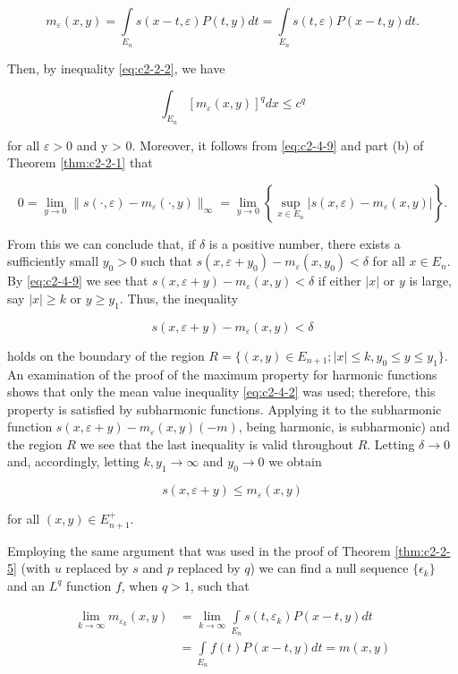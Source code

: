 \[
m_{\varepsilon}(x,y)=\int\limits_{E_{n}}s(x-t,\varepsilon)P(t,y)d t=\int\limits_{E_{n}}s(t,\varepsilon)P(x-t,y)d t.
\]

Then, by inequality \eqref{eq:c2-2-2}, we have

\begin{equation}\label{eq:c2-4-11}
\int_{E_{n}}[m_{\varepsilon}(x,y)]^{q}dx\leq c^{q}
\end{equation}

for all $\varepsilon > 0$ and y > 0. Moreover, it follows from \eqref{eq:c2-4-9} and part (b) of Theorem \ref{thm:c2-2-1} that

\[
0=\lim_{y\to0}\|s(\cdot,\varepsilon)-m_{\varepsilon}(\cdot,y)\|_{\infty}=\lim_{y\to0}\left\{\sup_{x\in E_{n}}|s(x,\varepsilon)-m_{\varepsilon}(x,y)|\right\}.
\]

From this we can conclude that, if $\delta$ is a positive number, there exists a sufficiently small $y_0 > 0$ such that $s(x, \varepsilon + y_0) - m_\varepsilon(x, y_0) < \delta$ for all $x \in E_n$. By \eqref{eq:c2-4-9} we see that $s(x, \varepsilon + y) - m_\varepsilon(x, y) < \delta$ if either $|x|$ or $y$ is large, say $|x| \geq k$ or $y \geq y_1$. Thus, the inequality

\[
s(x,\varepsilon+y)-m_{\varepsilon}(x,y)<\delta
\]

holds on the boundary of the region $R = \{(x, y) \in E_{n+1}; |x| \leq k, y_0 \leq y \leq y_1\}$. An examination of the proof of the maximum property for harmonic functions shows that only the mean value inequality \eqref{eq:c2-4-2} was used; therefore, this property is satisfied by subharmonic functions. Applying it to the subharmonic function $s(x, \varepsilon + y) - m_\varepsilon(x, y) (-m)$, being harmonic, is subharmonic) and the region $R$ we see that the last inequality is valid throughout $R$. Letting $\delta \to 0$ and, accordingly, letting $k, y_1 \to \infty$ and $y_0 \to 0$ we obtain

\begin{equation}\label{eq:c2-4-12}
s(x,\varepsilon+y)\leq m_{\varepsilon}(x,y)
\end{equation}

for all $(x, y) \in E_{n+1}^+$.

Employing the same argument that was used in the proof of Theorem \ref{thm:c2-2-5} (with $u$ replaced by $s$ and $p$ replaced by $q$) we can find a null sequence $\{\epsilon_k\}$ and an $L^q$ function $f$, when $q > 1$, such that

\[
\begin{aligned}\lim_{k\to\infty}m_{\varepsilon_{k}}(x,y)&=\lim_{k\to\infty}\int\limits_{E_{n}}s(t,\varepsilon_{k})P(x-t,y)dt\\&=\int\limits_{E_{n}}f(t)P(x-t,y)dt=m(x,y)\end{aligned}
\]

